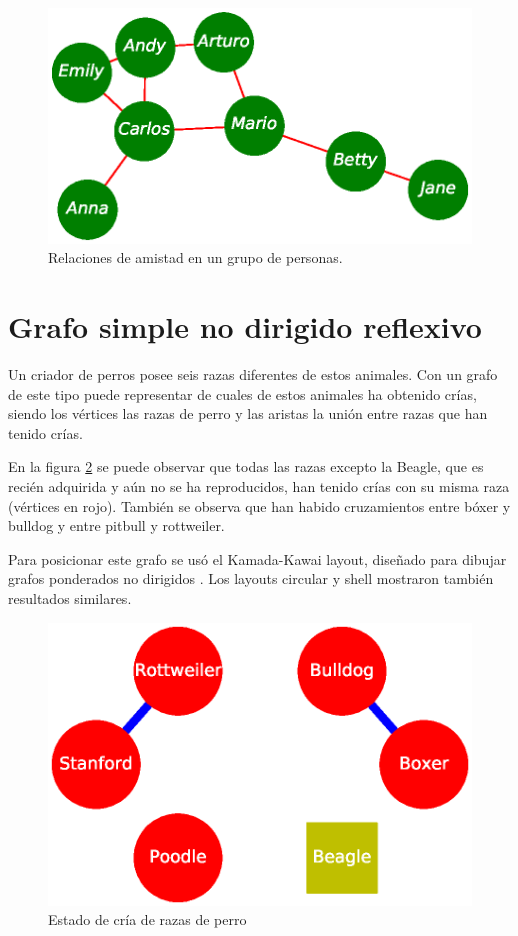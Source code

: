 \documentclass{article}
\begin{document}
\begin{figure}
 \begin{center}
  \includegraphics[width=.6\columnwidth]{fig2.eps}
   \end{center}
  \caption{Relaciones de amistad en un grupo de personas.}
  \label{Figura 2}
\end{figure}



\section{Grafo simple no dirigido reflexivo}

Un criador de perros posee seis razas diferentes de estos animales. Con un grafo de este tipo puede representar de cuales de estos animales ha obtenido crías, siendo los vértices las razas de perro y las aristas la unión entre razas que han tenido crías.

En la figura \ref{Figura 3} se puede observar que todas las razas excepto la Beagle, que es recién adquirida y aún no se ha reproducidos, han tenido crías con su misma raza (vértices en rojo). También se observa que han habido cruzamientos entre bóxer y bulldog y entre pitbull y rottweiler.

Para posicionar este grafo se usó el Kamada-Kawai layout, diseñado para dibujar grafos ponderados no dirigidos \cite{kamada1989algorithm}. Los layouts circular y shell mostraron también resultados similares.


\begin{figure}
  \includegraphics[width=.8\columnwidth]{fig3.eps}
  \caption{Estado de cría de razas de perro}
  \label{Figura 3}
\end{figure}
\end{document}
